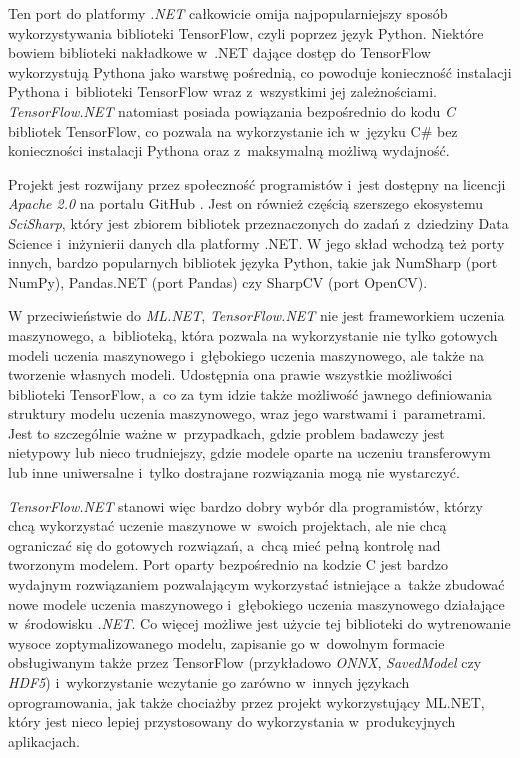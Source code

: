 Ten port do platformy \emph{.NET} całkowicie omija najpopularniejszy sposób wykorzystywania biblioteki TensorFlow, czyli poprzez język Python.
Niektóre bowiem biblioteki nakładkowe w~.NET dające dostęp do TensorFlow wykorzystują Pythona jako warstwę pośrednią, co powoduje konieczność instalacji Pythona i~biblioteki TensorFlow wraz z~wszystkimi jej zależnościami.
\emph{TensorFlow.NET} natomiast posiada powiązania bezpośrednio do kodu \emph{C} bibliotek TensorFlow, co pozwala na wykorzystanie ich w~języku C\# bez konieczności instalacji Pythona oraz z~maksymalną możliwą wydajność.

Projekt jest rozwijany przez społeczność programistów i~jest dostępny na licencji \emph{Apache 2.0} na portalu GitHub \cite{scisharp-tensorflownet-repo}.
Jest on również częścią szerszego ekosystemu \emph{SciSharp}, który jest zbiorem bibliotek przeznaczonych do zadań z~dziedziny Data Science i~inżynierii danych dla platformy .NET.
W jego skład wchodzą też porty innych, bardzo popularnych bibliotek języka Python, takie jak NumSharp (port NumPy), Pandas.NET (port Pandas) czy SharpCV (port OpenCV).

W przeciwieństwie do \emph{ML.NET}, \emph{TensorFlow.NET} nie jest frameworkiem uczenia maszynowego, a~biblioteką, która pozwala na wykorzystanie nie tylko gotowych modeli uczenia maszynowego i~głębokiego uczenia maszynowego, ale także na tworzenie własnych modeli.
Udostępnia ona prawie wszystkie możliwości biblioteki TensorFlow, a~co za tym idzie także możliwość jawnego definiowania struktury modelu uczenia maszynowego, wraz jego warstwami i~parametrami.
Jest to szczególnie ważne w~przypadkach, gdzie problem badawczy jest nietypowy lub nieco trudniejszy, gdzie modele oparte na uczeniu transferowym lub inne uniwersalne i~tylko dostrajane rozwiązania mogą nie wystarczyć.

\emph{TensorFlow.NET} stanowi więc bardzo dobry wybór dla programistów, którzy chcą wykorzystać uczenie maszynowe w~swoich projektach, ale nie chcą ograniczać się do gotowych rozwiązań, a~chcą mieć pełną kontrolę nad tworzonym modelem.
Port oparty bezpośrednio na kodzie C jest bardzo wydajnym rozwiązaniem pozwalającym wykorzystać istniejące a~także zbudować nowe modele uczenia maszynowego i~głębokiego uczenia maszynowego działające w~środowisku \emph{.NET}.
Co więcej możliwe jest użycie tej biblioteki do wytrenowanie wysoce zoptymalizowanego modelu, zapisanie go w~dowolnym formacie obsługiwanym także przez TensorFlow (przykładowo \emph{ONNX}, \emph{SavedModel} czy \emph{HDF5}) i~wykorzystanie wczytanie go zarówno w~innych językach oprogramowania, jak także chociażby przez projekt wykorzystujący ML.NET, który jest nieco lepiej przystosowany do wykorzystania w~produkcyjnych aplikacjach.

